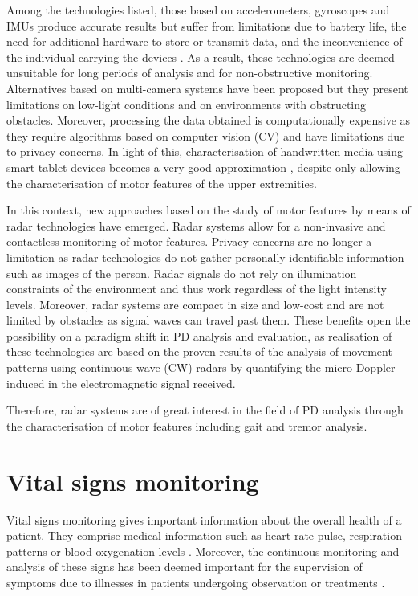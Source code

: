 	Among the technologies listed, those based on accelerometers, gyroscopes and IMUs produce accurate results but suffer from limitations due to battery life, the need for additional hardware to store or transmit data, and the inconvenience of the individual carrying the devices \cite{Biase2020}. As a result, these technologies are deemed unsuitable for long periods of analysis and for non-obstructive monitoring. Alternatives based on multi-camera systems have been proposed \cite{MurodelaHerran2014} but they present limitations on low-light conditions and on environments with obstructing obstacles. Moreover, processing the data obtained is computationally expensive as they require algorithms based on computer vision (CV) and have limitations due to privacy concerns. In light of this, characterisation of handwritten media using smart tablet devices becomes a very good approximation \cite{Danna2019}, despite only allowing the characterisation of motor features of the upper extremities.

	In this context, new approaches based on the study of motor features by means of radar technologies have emerged. Radar systems allow for a non-invasive and contactless monitoring of motor features. Privacy concerns are no longer a limitation as radar technologies do not gather personally identifiable information such as images of the person. Radar signals do not rely on illumination constraints of the environment and thus work regardless of the light intensity levels. Moreover, radar systems are compact in size and low-cost and are not limited by obstacles as signal waves can travel past them. These benefits open the possibility on a paradigm shift in PD analysis and evaluation, as realisation of these technologies are based on the proven results of the analysis of movement patterns using continuous wave (CW) radars \cite{Seifert2019, Biase2020} by quantifying the micro-Doppler induced in the electromagnetic signal received.

	Therefore, radar systems are of great interest in the field of PD analysis through the characterisation of motor features including gait and tremor analysis.
	
	
	\section{Vital signs monitoring}
	
	Vital signs monitoring gives important information about the overall health of a patient. They comprise medical information such as heart rate pulse, respiration patterns or blood oxygenation levels \cite{Iyer2022}. Moreover, the continuous monitoring and analysis of these signs has been deemed important for the supervision of symptoms due to illnesses in patients undergoing observation or treatments \cite{Prgomet2016,Weenk2017,Villarroel2014}.
	
